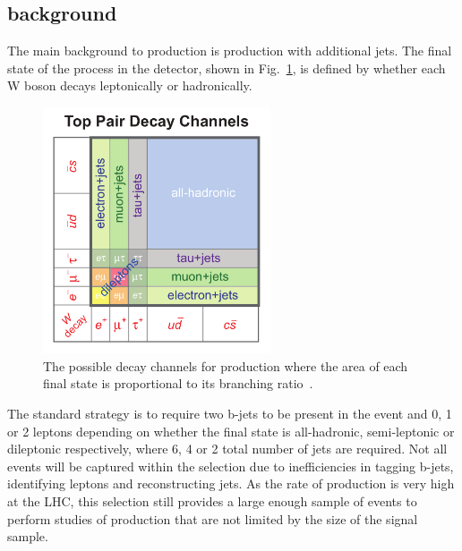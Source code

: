 \subsection{\ttbar background}
% 



The main background to \tttt production is \ttbar production with additional jets. The final state of the \ttbar process in the detector, shown in Fig.~\ref{fig:ttbarDecay}, is defined by whether each W boson decays leptonically or hadronically.

\begin{figure}[ht!]
\centering
    \includegraphics[width=0.6\textwidth]{images/Analysis/top_pair_decay_channels.pdf}

    \caption{The possible decay channels for \ttbar production where the area of each final state is proportional to its branching ratio~\cite{tdecaysource}.}
    \label{fig:ttbarDecay}
\end{figure}
The standard strategy is to require two b-jets to be present in the event and 0, 1 or 2 leptons depending on whether the final state is all-hadronic, semi-leptonic or dileptonic respectively, where 6, 4 or 2 total number of jets are required. Not all \ttbar events will be captured within the selection due to inefficiencies in tagging b-jets, identifying leptons and reconstructing jets. As the rate of \ttbar production is very high at the LHC, this selection still provides a large enough sample of events to perform studies of \ttbar production that are not limited by the size of the signal sample.


